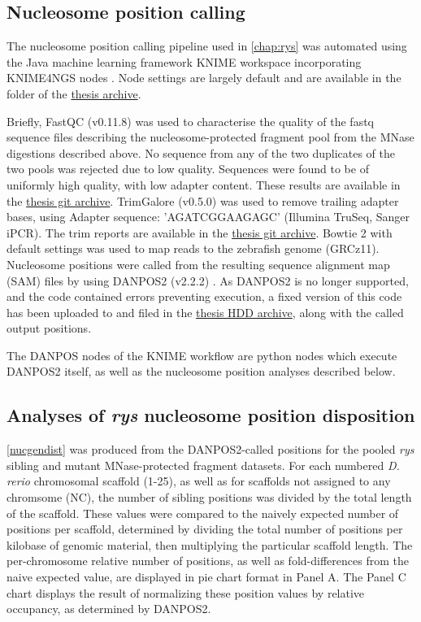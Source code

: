 \documentclass{ut-thesis}
\begin{document}
\begin{NoHyper}
\subsection{Nucleosome position calling}
\label{ssec:rysposcall}
The nucleosome position calling pipeline used in \autoref{chap:rys} was automated using the Java machine learning framework KNIME \cite{Dietz2016} workspace incorporating KNIME4NGS nodes \cite{Hastreiter2017}. Node settings are largely default and are available in the  folder of the \hyperref[sec:archive]{thesis archive}.

Briefly, FastQC (v0.11.8) \cite{Andrews2018} was used to characterise the quality of the fastq sequence files describing the nucleosome-protected fragment pool from the MNase digestions described above. No sequence from any of the two duplicates of the two pools was rejected due to low quality. Sequences were found to be of uniformly high quality, with low adapter content. These results are available in the  \hyperref[sec:archive]{thesis git archive}. TrimGalore (v0.5.0) \cite{Andrews2018a} was used to remove trailing adapter bases, using Adapter sequence: 'AGATCGGAAGAGC' (Illumina TruSeq, Sanger iPCR). The trim reports are available in the \hyperref[sec:archive]{thesis git archive}.  Bowtie 2 \cite{Langmead2012} with default settings was used to map reads to the zebrafish genome (GRCz11). Nucleosome positions were called from the resulting sequence alignment map (SAM) files by using DANPOS2 (v2.2.2) \cite{Chen2013}. As DANPOS2 is no longer supported, and the code contained errors preventing execution, a fixed version of this code has been uploaded to  and filed in the \hyperref[sec:archive]{thesis HDD archive}, along with the called output positions.

The DANPOS nodes of the KNIME workflow are python nodes which execute DANPOS2 itself, as well as the nucleosome position analyses described below. 

\subsection{Analyses of \textit{rys} nucleosome position disposition}
\label{ssec:rysnucpos}
\autoref{nucgendist} was produced from the DANPOS2-called positions for the pooled \textit{rys} sibling and mutant MNase-protected fragment datasets. For each numbered \textit{D. rerio} chromosomal scaffold (1-25), as well as for scaffolds not assigned to any chromsome (NC), the number of sibling positions was divided by the total length of the scaffold. These values were compared to the naively expected number of positions per scaffold, determined by dividing the total number of positions per kilobase of genomic material, then multiplying the particular scaffold length. The per-chromosome relative number of positions, as well as fold-differences from the naive expected value, are displayed in pie chart format in Panel A. The Panel C chart displays the result of normalizing these position values by relative occupancy, as determined by DANPOS2. 


\end{NoHyper}
\end{document}
